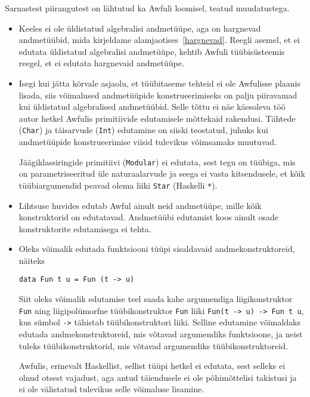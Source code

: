 \documentclass[12pt]{article}
\begin{document}
        Sarnastest piirangutest on lähtutud ka Awfuli loomisel, teatud muudatustega.

        \begin{itemize}
          \item
            Keeles ei ole üldistatud algebralisi andmetüüpe, aga on hargnevad andmetüübid, mida kirjeldame alamjaotises~\ref{hargnevad}. Reegli asemel, et ei edutata üldistatud algebralisi andmetüüpe, kehtib Awfuli tüübisüsteemis reegel, et ei edutata hargnevaid andmetüüpe.
          \item
            Isegi kui jätta kõrvale asjaolu, et tüübitaseme tehteid ei ole Awfulisse plaanis lisada, siis võimalused andmetüüpide konstrueerimiseks on palju piiravamad kui üldistatud algebralised andmetüübid. Selle tõttu ei näe käesoleva töö autor hetkel Awfulis primitiivide edutamisele mõttekaid rakendusi. Tähtede (\verb!Char!) ja täisarvude (\verb!Int!) edutamine on siiski teostatud, juhuks kui andmetüüpide konstrueerimise viisid tulevikus võimsamaks muutuvad.

            Jäägiklassiringide primitiivi (\verb!Modular!) ei edutata, sest tegu on tüübiga, mis on parametriseeritud üle naturaalarvude ja seega ei vasta kitsendusele, et kõik tüübiargumendid peavad olema liiki \verb!Star! (Haskelli \verb!*!).
          \item
            Lihtsuse huvides edutab Awful ainult neid andmetüüpe, mille kõik konstruktorid on edutatavad. Andmetüübi edutamist koos ainult osade konstruktorite edutamisega ei tehta.
          \item
            Oleks võimalik edutada funktsiooni tüüpi sisaldavaid andmekonstruktoreid, näiteks

            \begin{verbatim}data Fun t u = Fun (t -> u)\end{verbatim}

            Siit oleks võimalik edutamise teel saada kahe argumendiga liigikonstruktor \verb!Fun! ning liigipolümorfne tüübikonstruktor \verb!Fun! liiki \verb!Fun(t -> u) -> Fun t u!, kus sümbol \verb!->! tähistab tüübikonstruktori liiki. Selline edutamine võimaldaks edutada andmekonstruktoreid, mis võtavad argumendiks funktsioone, ja neist tuleks tüübikonstruktorid, mis võtavad argumendiks tüübikonstruktoreid.

            Awfulis, erinevalt Haskellist, sellist tüüpi hetkel ei edutata, sest selleks ei olnud otsest vajadust, aga antud täiendusele ei ole põhimõttelisi takistusi ja ei ole välistatud tulevikus selle võimaluse lisamine.
        \end{itemize}
\end{document}
